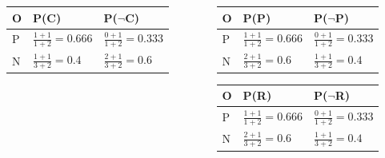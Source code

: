 \documentclass[aspectratio=169, 10pt]{beamer}
\begin{document}
\begin{frame}[t]
\begin{columns}
\begin{column}{0.5\textwidth}
            \begin{table}[]
                \small
                \begin{tabular}{lll}
                O & P(C) & P($\neg$C) \\ \hline
                P & $\frac{1+1}{1+2}=0.666$ & $\frac{0+1}{1+2}=0.333$ \\
                N & $\frac{1+1}{3+2}=0.4$ & $\frac{2+1}{3+2}=0.6$ \\
                \end{tabular}
            \end{table}
        \end{column}
        \begin{column}{0.5\textwidth}
            \begin{table}[]
                \small
                \begin{tabular}{lll}
                O & P(P) & P($\neg$P) \\ \hline
                P & $\frac{1+1}{1+2}=0.666$ & $\frac{0+1}{1+2}=0.333$ \\
                N & $\frac{2+1}{3+2}=0.6$ & $\frac{1+1}{3+2}=0.4$ \\
                \end{tabular}
            \end{table}

            \begin{table}[]
                \small
                \begin{tabular}{lll}
                O & P(R) & P($\neg$R) \\ \hline
                P & $\frac{1+1}{1+2}=0.666$ & $\frac{0+1}{1+2}=0.333$ \\
                N & $\frac{2+1}{3+2}=0.6$ & $\frac{1+1}{3+2}=0.4$ \\
                \end{tabular}
            \end{table}
        \end{column}
    \end{columns}

\end{frame}
\end{document}
